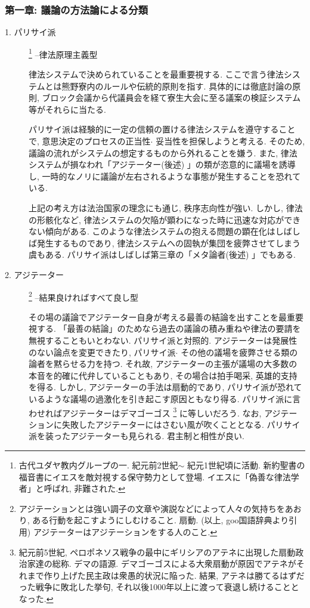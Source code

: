 \documentclass[10pt,b5jsbook,dvips,dvipdfmx,openany]{jsbook}
\theoremstyle{definition}
\begin{document}
			\subsubsection{第一章: 議論の方法論による分類}
			\begin{description}
			\item[1. パリサイ派] \footnote{古代ユダヤ教内グループの一. 紀元前2世紀$ \sim $ 紀元1世紀頃に活動. 新約聖書の福音書にイエスを敵対視する保守勢力として登場. イエスに「偽善な律法学者」と呼ばれ, 非難された.} --律法原理主義型

			律法システムで決められていることを最重要視する. ここで言う律法システムとは熊野寮内のルールや伝統的原則を指す. 具体的には徹底討論の原則, ブロック会議から代議員会を経て寮生大会に至る議案の検証システム等がそれらに当たる.

			パリサイ派は経験的に一定の信頼の置ける律法システムを遵守することで, 意思決定のプロセスの正当性$ \cdot $ 妥当性を担保しようと考える. そのため, 議論の流れがシステムの想定するものから外れることを嫌う. また, 律法システムが損なわれ「アジテーター(後述) 」の類が恣意的に議場を誘導し, 一時的なノリに議論が左右されるような事態が発生することを恐れている.

			上記の考え方は法治国家の理念にも通じ, 秩序志向性が強い. しかし, 律法の形骸化など, 律法システムの欠陥が顕わになった時に迅速な対応ができない傾向がある. このような律法システムの抱える問題の顕在化はしばしば発生するものであり, 律法システムへの固執が集団を疲弊させてしまう虞もある. パリサイ派はしばしば第三章の「メタ論者(後述) 」でもある.

			\item[2. アジテーター] \footnote{アジテーションとは強い調子の文章や演説などによって人々の気持ちをあおり, ある行動を起こすようにしむけること.  扇動. (以上, goo国語辞典より引用) アジテーターはアジテーションをする人のこと. } --結果良ければすべて良し型

			その場の議論でアジテーター自身が考える最善の結論を出すことを最重要視する. 「最善の結論」のためなら過去の議論の積み重ねや律法の要請を無視することもいとわない. パリサイ派と対照的. アジテーターは発展性のない論点を変更できたり, パリサイ派$ \cdot $ その他の議場を疲弊させる類の論者を黙らせる力を持つ. それ故, アジテーターの主張が議場の大多数の本音を的確に代弁していることもあり, その場合は拍手喝采, 英雄的支持を得る. しかし, アジテーターの手法は扇動的であり, パリサイ派が恐れているような議場の過激化を引き起こす原因ともなり得る. パリサイ派に言わせればアジテーターはデマゴーゴス \footnote{紀元前5世紀, ペロポネソス戦争の最中にギリシアのアテネに出現した扇動政治家達の総称. デマの語源. デマゴーゴスによる大衆扇動が原因でアテネがそれまで作り上げた民主政は衆愚的状況に陥った. 結果, アテネは勝てるはずだった戦争に敗北した挙句, それ以後1000年以上に渡って衰退し続けることとなった. } に等しいだろう. なお, アジテーションに失敗したアジテーターにはさむい風が吹くこととなる.
パリサイ派を装ったアジテーターも見られる. 君主制と相性が良い.


\end{description}
\end{document}
